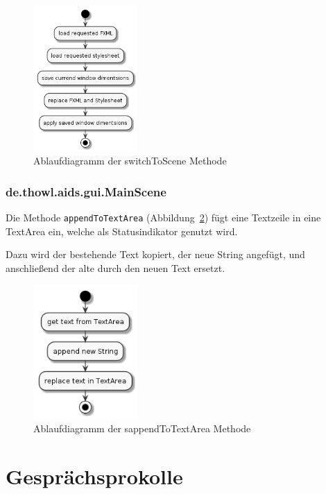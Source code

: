 \documentclass[stu, a4paper, 11pt, floatsintext]{apa7}
\begin{document}
\begin{figure}[!htbp]
\centering
\includegraphics[width=150px]{../technical_documentation/diagramm/uml/flowcharts/gui/controller/switchToScene.png}
\caption{\label{switchToScene-methode}Ablaufdiagramm der switchToScene Methode}
\end{figure}

\subsubsection{de.thowl.aids.gui.MainScene}

\noindent Die Methode \texttt{appendToTextArea} (Abbildung~\ref{appendToTextArea-methode}) fügt eine Textzeile in eine TextArea ein, welche als Statusindikator genutzt wird.

Dazu wird der bestehende Text kopiert, der neue String angefügt, und anschließend der alte durch den neuen Text ersetzt.

\begin{figure}[!htbp]
\centering
\includegraphics[width=150px]{../technical_documentation/diagramm/uml/flowcharts/gui/mainscene/appendToTextArea.png}
\caption{\label{appendToTextArea-methode}Ablaufdiagramm der sappendToTextArea Methode}
\end{figure}

\clearpage

\section{Gesprächsprokolle}
\end{document}

